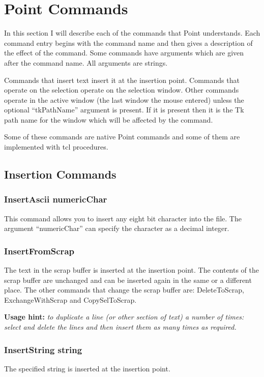 \section{Point Commands} \label{sect:commands}

In this section I will describe each of the commands that Point understands.
Each command entry begins with the command name and then gives a description
of the effect of the command.
Some commands have arguments which are given after the command name.
All arguments are strings.

Commands that insert text insert it at the insertion point.
Commands that operate on the selection operate on the selection window.
Other commands operate in the active window (the last window the
mouse entered) unless the optional ``tkPathName'' argument is present.
If it is present then it is the Tk path name for the window
which will be affected by the command.

Some of these commands are native Point commands and some of them
are implemented with tcl procedures.




\subsection{Insertion Commands}

\subsubsection{InsertAscii numericChar}
This command allows you to insert any eight bit character into the file.
The argument ``numericChar'' can specify the character as a decimal integer.

\subsubsection{InsertFromScrap}
The text in the scrap buffer is inserted at the insertion point.
The contents of the scrap buffer are unchanged and can be inserted again
in the same or a different place.
The other commands that change the scrap buffer are:
DeleteToScrap, ExchangeWithScrap and CopySelToScrap.

{\bf Usage hint:} {\it  to duplicate a line (or other section of text)
a number of times: select and delete the lines and then
insert them as many times as required.}

\subsubsection{InsertString string}
The specified string is inserted at the insertion point.

